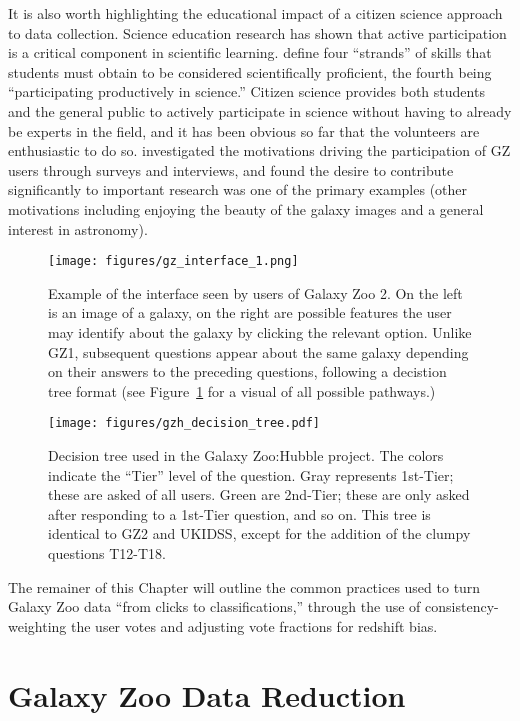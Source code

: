 It is also worth highlighting the educational impact of a citizen science approach to data collection. Science education research has shown that active participation is a critical component in scientific learning. \citet{Michaels2008} define four ``strands'' of skills that students must obtain to be considered scientifically proficient, the fourth being ``participating productively in science.'' Citizen science provides both students and the general public to actively participate in science without having to already be experts in the field, and it has been obvious so far that the volunteers are enthusiastic to do so. \citet{Raddick2010} investigated the motivations driving the participation of GZ users through surveys and interviews, and found the desire to contribute significantly to important research was one of the primary examples (other motivations including enjoying the beauty of the galaxy images and a general interest in astronomy). 


\begin{figure}
\centering
\texttt{[image: figures/gz\_interface\_1.png]}
\caption{Example of the interface seen by users of Galaxy Zoo 2. On the left is an image of a galaxy, on the right are possible features the user may identify about the galaxy by clicking the relevant option. Unlike GZ1, subsequent questions appear about the same galaxy depending on their answers to the preceding questions, following a decistion tree format (see Figure~\ref{fig:decisiontree} for a visual of all possible pathways.)}
\end{figure}

\begin{figure}
\centering
\texttt{[image: figures/gzh\_decision\_tree.pdf]}
\label{fig:decisiontree}
\caption{Decision tree used in the Galaxy Zoo:Hubble project. The colors indicate the ``Tier'' level of the question. Gray represents 1st-Tier; these are asked of all users. Green are 2nd-Tier; these are only asked after responding to a 1st-Tier question, and so on. This tree is identical to GZ2 and UKIDSS, except for the addition of the clumpy questions T12-T18.}
\end{figure}

The remainer of this Chapter will outline the common practices used to turn Galaxy Zoo data ``from clicks to classifications,'' through the use of consistency-weighting the user votes and adjusting vote fractions for redshift bias. 

\section{Galaxy Zoo Data Reduction}
